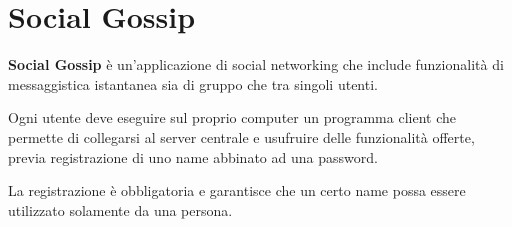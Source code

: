 \section{Social Gossip}
\textbf{Social Gossip} è un'applicazione di social networking che include funzionalità di messaggistica istantanea sia di gruppo che tra singoli utenti.

Ogni utente deve eseguire sul proprio computer un programma client che permette di collegarsi al server centrale e usufruire delle funzionalità offerte, previa registrazione di uno name abbinato ad una password.

La registrazione è obbligatoria e garantisce che un certo name possa essere utilizzato solamente da una persona.